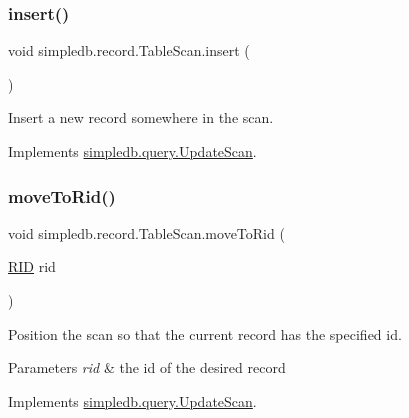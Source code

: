 \subsubsection{\texorpdfstring{insert()}{insert()}}
{\footnotesize\ttfamily void simpledb.\+record.\+Table\+Scan.\+insert (\begin{DoxyParamCaption}{ }\end{DoxyParamCaption})\hspace{0.3cm}{\ttfamily [inline]}}

Insert a new record somewhere in the scan. 

Implements \hyperlink{interfacesimpledb_1_1query_1_1UpdateScan_a6a281cd50f596c008e868bddd0534774}{simpledb.\+query.\+Update\+Scan}.

\mbox{\label{classsimpledb_1_1record_1_1TableScan_a21372d00e959d8bbe5eee1c8bda8f08b}} 
\subsubsection{\texorpdfstring{move\+To\+Rid()}{moveToRid()}}
{\footnotesize\ttfamily void simpledb.\+record.\+Table\+Scan.\+move\+To\+Rid (\begin{DoxyParamCaption}\item[{\hyperlink{classsimpledb_1_1record_1_1RID}{R\+ID}}]{rid }\end{DoxyParamCaption})\hspace{0.3cm}{\ttfamily [inline]}}

Position the scan so that the current record has the specified id. 
\begin{DoxyParams}{Parameters}
{\em rid} & the id of the desired record \\
\hline
\end{DoxyParams}


Implements \hyperlink{interfacesimpledb_1_1query_1_1UpdateScan_a5096e90da6d88cfaa015cd3aa20bc9d7}{simpledb.\+query.\+Update\+Scan}.

\mbox{\label{classsimpledb_1_1record_1_1TableScan_aefc2187ef691253a8d569d01f423c18b}} 
